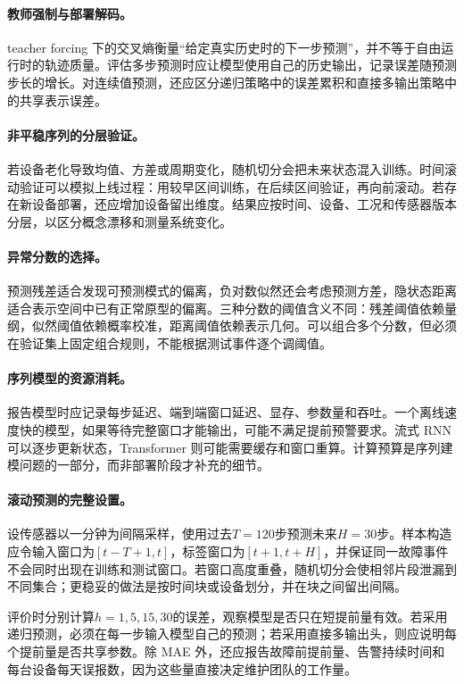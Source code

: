 \paragraph{教师强制与部署解码。}
teacher forcing 下的交叉熵衡量“给定真实历史时的下一步预测”，并不等于自由运行时的轨迹质量。评估多步预测时应让模型使用自己的历史输出，记录误差随预测步长的增长。对连续值预测，还应区分递归策略中的误差累积和直接多输出策略中的共享表示误差。

\paragraph{非平稳序列的分层验证。}
若设备老化导致均值、方差或周期变化，随机切分会把未来状态混入训练。时间滚动验证可以模拟上线过程：用较早区间训练，在后续区间验证，再向前滚动。若存在新设备部署，还应增加设备留出维度。结果应按时间、设备、工况和传感器版本分层，以区分概念漂移和测量系统变化。

\paragraph{异常分数的选择。}
预测残差适合发现可预测模式的偏离，负对数似然还会考虑预测方差，隐状态距离适合表示空间中已有正常原型的偏离。三种分数的阈值含义不同：残差阈值依赖量纲，似然阈值依赖概率校准，距离阈值依赖表示几何。可以组合多个分数，但必须在验证集上固定组合规则，不能根据测试事件逐个调阈值。

\paragraph{序列模型的资源消耗。}
报告模型时应记录每步延迟、端到端窗口延迟、显存、参数量和吞吐。一个离线速度快的模型，如果等待完整窗口才能输出，可能不满足提前预警要求。流式 RNN 可以逐步更新状态，Transformer 则可能需要缓存和窗口重算。计算预算是序列建模问题的一部分，而非部署阶段才补充的细节。

\paragraph{滚动预测的完整设置。}
设传感器以一分钟为间隔采样，使用过去$T=120$步预测未来$H=30$步。样本构造应令输入窗口为$[t-T+1,t]$，标签窗口为$[t+1,t+H]$，并保证同一故障事件不会同时出现在训练和测试窗口。若窗口高度重叠，随机切分会使相邻片段泄漏到不同集合；更稳妥的做法是按时间块或设备划分，并在块之间留出间隔。

评价时分别计算$h=1,5,15,30$的误差，观察模型是否只在短提前量有效。若采用递归预测，必须在每一步输入模型自己的预测；若采用直接多输出头，则应说明每个提前量是否共享参数。除 MAE 外，还应报告故障前提前量、告警持续时间和每台设备每天误报数，因为这些量直接决定维护团队的工作量。

